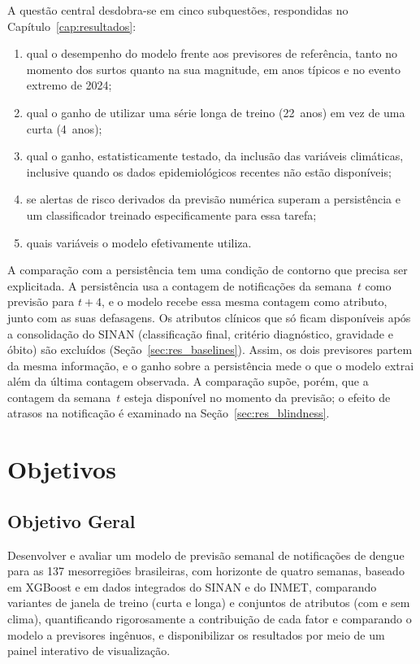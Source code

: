 A questão central desdobra-se em cinco subquestões, respondidas no Capítulo~\ref{cap:resultados}:
\begin{enumerate}[label=(\roman*)]
    \item qual o desempenho do modelo frente aos previsores de referência, tanto no momento dos surtos quanto na sua magnitude, em anos típicos e no evento extremo de 2024;
    \item qual o ganho de utilizar uma série longa de treino (22~anos) em vez de uma curta (4~anos);
    \item qual o ganho, estatisticamente testado, da inclusão das variáveis climáticas, inclusive quando os dados epidemiológicos recentes não estão disponíveis;
    \item se alertas de risco derivados da previsão numérica superam a persistência e um classificador treinado especificamente para essa tarefa;
    \item quais variáveis o modelo efetivamente utiliza.
\end{enumerate}

A comparação com a persistência tem uma condição de contorno que precisa ser explicitada. A persistência usa a contagem de notificações da semana~$t$ como previsão para $t+4$, e o modelo recebe essa mesma contagem como atributo, junto com as suas defasagens. Os atributos clínicos que só ficam disponíveis após a consolidação do SINAN (classificação final, critério diagnóstico, gravidade e óbito) são excluídos (Seção~\ref{sec:res_baselines}). Assim, os dois previsores partem da mesma informação, e o ganho sobre a persistência mede o que o modelo extrai além da última contagem observada. A comparação supõe, porém, que a contagem da semana~$t$ esteja disponível no momento da previsão; o efeito de atrasos na notificação é examinado na Seção~\ref{sec:res_blindness}.

\section{Objetivos}

\subsection{Objetivo Geral}

Desenvolver e avaliar um modelo de previsão semanal de notificações de dengue para as 137 mesorregiões brasileiras, com horizonte de quatro semanas, baseado em XGBoost e em dados integrados do SINAN e do INMET, comparando variantes de janela de treino (curta e longa) e conjuntos de atributos (com e sem clima), quantificando rigorosamente a contribuição de cada fator e comparando o modelo a previsores ingênuos, e disponibilizar os resultados por meio de um painel interativo de visualização.

